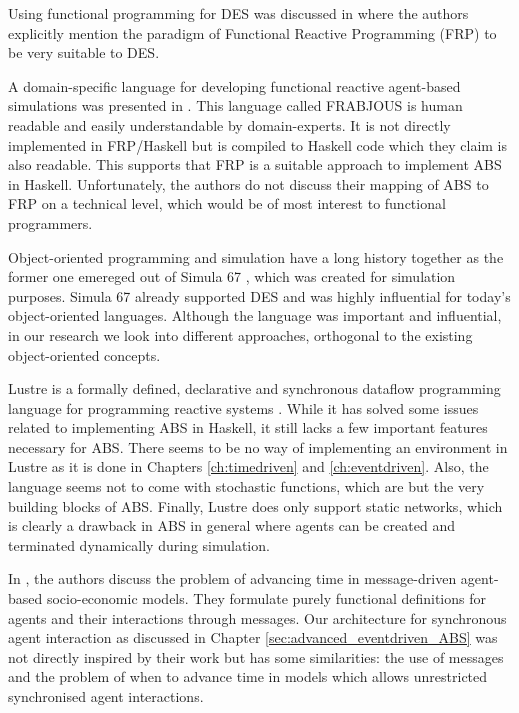 Using functional programming for DES was discussed in \cite{jankovic_functional_2007} where the authors explicitly mention the paradigm of Functional Reactive Programming (FRP) to be very suitable to DES.

A domain-specific language for developing functional reactive agent-based simulations was presented in \cite{schneider_towards_2012,vendrov_frabjous_2014}. This language called FRABJOUS is human readable and easily understandable by domain-experts. It is not directly implemented in FRP/Haskell but is compiled to Haskell code which they claim is also readable. This supports that FRP is a suitable approach to implement ABS in Haskell. Unfortunately, the authors do not discuss their mapping of ABS to FRP on a technical level, which would be of most interest to functional programmers.

Object-oriented programming and simulation have a long history together as the former one emereged out of Simula 67 \cite{dahl_birth_2002}, which was created for simulation purposes. Simula 67 already supported DES and was highly influential for today's object-oriented languages. Although the language was important and influential, in our research we look into different approaches, orthogonal to the existing object-oriented concepts.

Lustre is a formally defined, declarative and synchronous dataflow programming language for programming reactive systems \cite{halbwachs_synchronous_1991}. While it has solved some issues related to implementing ABS in Haskell, it still lacks a few important features necessary for ABS. There seems to be no way of implementing an environment in Lustre as it is done in Chapters \ref{ch:timedriven} and \ref{ch:eventdriven}. Also, the language seems not to come with stochastic functions, which are but the very building blocks of ABS. Finally, Lustre does only support static networks, which is clearly a drawback in ABS in general where agents can be created and terminated dynamically during simulation.

In \cite{botta_time_2010}, the authors discuss the problem of advancing time in message-driven agent-based socio-economic models. They formulate purely functional definitions for agents and their interactions through messages. Our architecture for synchronous agent interaction as discussed in Chapter \ref{sec:advanced_eventdriven_ABS} was not directly inspired by their work but has some similarities: the use of messages and the problem of when to advance time in models which allows unrestricted synchronised agent interactions.

